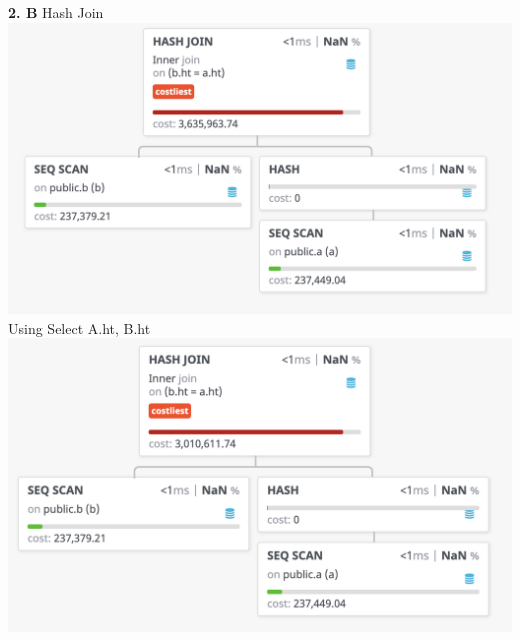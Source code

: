 \documentclass[12pt, letterpaper, fleqn]{article}
\begin{document}
  \textbf{2. B}
  Hash Join \\
  \includegraphics[scale=0.5]{query_pics/2.png} \\
  Using Select A.ht, B.ht\\
  \includegraphics[scale=0.5]{query_pics/2b.png} \\\\
\end{document}
